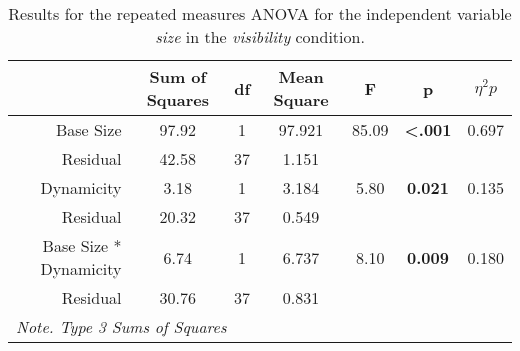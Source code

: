 \begin{table*}[ht]
    \centering
    \caption{Results for the repeated measures ANOVA for the independent variable \textit{size} in the \textit{visibility} condition.}
    \begin{tabular}{r|cccccc}
    \toprule
                                  & \textbf{Sum of Squares} & \textbf{df} & \textbf{Mean Square} & \textbf{F} & \textbf{p} & \textbf{$\eta^2p$} \\
    \midrule
    Base Size                     & 97.92                   & 1           & 97.921              & 85.09       & \textbf{<.001}      & 0.697              \\
    Residual                      & 42.58                   & 37          & 1.151               &             &            &                    \\
    Dynamicity                    & 3.18                    & 1           & 3.184               & 5.80        & \textbf{0.021}      & 0.135              \\
    Residual                      & 20.32                   & 37          & 0.549               &             &            &                    \\
    Base Size * Dynamicity        & 6.74                    & 1           & 6.737               & 8.10        & \textbf{0.009}      & 0.180              \\
    Residual                      & 30.76                   & 37          & 0.831               &             &            &                    \\
    \bottomrule
    \multicolumn{7}{l}{\textit{Note. Type 3 Sums of Squares}}                                                                                                                                                                                                  
    \end{tabular}
\end{table*}

